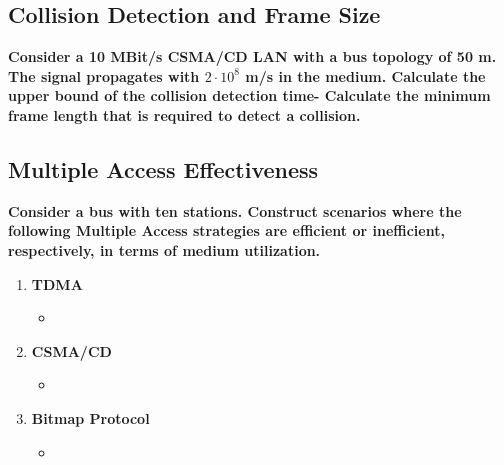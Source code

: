 \documentclass[a4paper,12pt]{article}
\begin{document}
	
	\subsection{Collision Detection and Frame Size}
	\textbf{Consider a 10 MBit/s CSMA/CD LAN with a bus topology of 50 m. The signal propagates with $2 \cdot 10^8$ m/s in the medium. Calculate the upper bound of the collision detection time- Calculate the minimum frame length that is required to detect a collision.}
	
	
	
	\subsection{Multiple Access Effectiveness}
	\textbf{Consider a bus with ten stations. Construct scenarios where the following Multiple Access strategies are efficient or inefficient, respectively, in terms of medium utilization.}
		\begin{enumerate}[label=(\roman*),itemsep=0pt]
		\item \textbf{TDMA}
		\begin{itemize}[itemsep=0pt]
			\item 
		\end{itemize}
		\item \textbf{CSMA/CD}
		\begin{itemize}[itemsep=0pt]
			\item 
		\end{itemize}
		\item \textbf{Bitmap Protocol}
		\begin{itemize}[itemsep=0pt]
			\item 
		\end{itemize}
	\end{enumerate}
	
\end{document}
